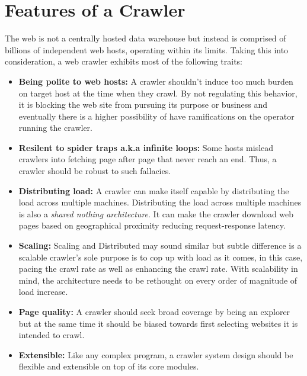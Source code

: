 \pagebreak

\section{Features of a Crawler}
The web is not a centrally hosted data warehouse but instead is comprised of billions of independent
web hosts, operating within its limits. Taking this into consideration, a web crawler exhibits most of the
following traits:

\begin{itemize}
\item \textbf{Being polite to web hosts:} A crawler shouldn't induce too much burden on target host
  at the time when they crawl. By not regulating this behavior, it is blocking the web site from pursuing
  its purpose or business and eventually there is a higher possibility of have ramifications on the
  operator running the crawler.
\item \textbf{Resilent to spider traps a.k.a infinite loops:} Some hosts mislead crawlers into fetching page after page that
  never reach an end. Thus, a crawler should be robust to such fallacies.
\item \textbf{Distributing load:} A crawler can make itself capable by distributing the load across
  multiple machines. Distributing the load across multiple machines is also a \textit{shared nothing
    architecture}. It can make the crawler download web pages based on geographical proximity reducing
  request-response latency.
\item \textbf{Scaling:} Scaling and Distributed may sound similar but subtle difference is a scalable
  crawler's sole purpose is to cop up with load as it comes, in this case, pacing the crawl rate as well
  as enhancing the crawl rate. With scalability in mind, the architecture needs to be rethought on every
  order of magnitude of load increase.
\item \textbf{Page quality:} A crawler should seek broad coverage by being an explorer but at the same
  time it should be biased towards first selecting websites it is intended to crawl.
\item \textbf{Extensible:} Like any complex program, a crawler system design should be flexible and
  extensible on top of its core modules.
\end{itemize}

\pagebreak